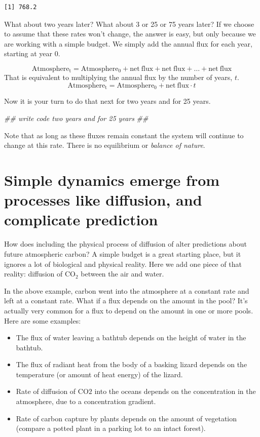 \documentclass[
  letterpaper,
  DIV=11,
  numbers=noendperiod]{scrreprt}
\newenvironment{Shaded}{\begin{snugshade}}{\end{snugshade}}
\newcommand{\DocumentationTok}[1]{\textcolor[rgb]{0.37,0.37,0.37}{\textit{#1}}}
\providecommand{\tightlist}{%
  \setlength{\itemsep}{0pt}\setlength{\parskip}{0pt}}
\begin{document}
\begin{verbatim}
[1] 768.2
\end{verbatim}

What about two years later? What about 3 or 25 or 75 years later? If we
choose to assume that these rates won't change, the answer is easy, but
only because we are working with a simple budget. We simply add the
annual flux for each year, starting at year 0.

\[\mathrm{Atmosphere_{t}} = \mathrm{Atmosphere_{0}} + \mathrm{net~flux} + \mathrm{net~flux} + \ldots + \mathrm{net~flux}\]
That is equivalent to multiplying the annual flux by the number of
years, \(t\).
\[\mathrm{Atmosphere_{t}} = \mathrm{Atmosphere_{0}} + \mathrm{net~flux}\cdot t\]

Now it is your turn to do that next for two years and for 25 years.

\begin{Shaded}
\begin{Highlighting}[]
\DocumentationTok{\#\# write code two years and for 25 years}
\DocumentationTok{\#\# }
\end{Highlighting}
\end{Shaded}

Note that as long as these fluxes remain constant the system will
continue to change at this rate. There is no equilibrium or
\emph{balance of nature}.

\section{Simple dynamics emerge from processes like diffusion, and
complicate
prediction}\label{simple-dynamics-emerge-from-processes-like-diffusion-and-complicate-prediction}

How does including the physical process of diffusion of alter
predictions about future atmospheric carbon? A simple budget is a great
starting place, but it ignores a lot of biological and physical reality.
Here we add one piece of that reality: diffusion of CO\(_2\) between the
air and water.

In the above example, carbon went into the atmosphere at a constant rate
and left at a constant rate. What if a flux depends on the amount in the
pool? It's actually very common for a flux to depend on the amount in
one or more pools. Here are some examples:

\begin{itemize}
\tightlist
\item
  The flux of water leaving a bathtub depends on the height of water in
  the bathtub.
\item
  The flux of radiant heat from the body of a basking lizard depends on
  the temperature (or amount of heat energy) of the lizard.
\item
  Rate of diffusion of CO\(2\) into the oceans depends on the
  concentration in the atmosphere, due to a concentration gradient.
\item
  Rate of carbon capture by plants depends on the amount of vegetation
  (compare a potted plant in a parking lot to an intact forest).
\end{itemize}
\end{document}
